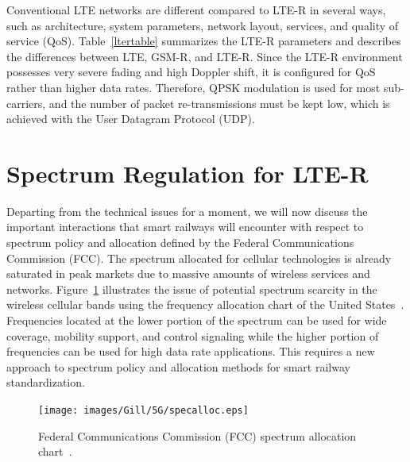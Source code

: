 Conventional LTE networks are different compared to LTE-R in several ways, such as architecture, system parameters, network layout, services, and quality of service (QoS). Table~\ref{ltertable} summarizes the LTE-R parameters and describes the differences between LTE, GSM-R, and LTE-R. Since the LTE-R environment possesses very severe fading and high Doppler shift, it is configured for QoS rather than higher data rates. Therefore, QPSK modulation is used for most sub-carriers, and the number of packet re-transmissions must be kept low, which is achieved with the User Datagram Protocol (UDP).


\section{Spectrum Regulation for LTE-R}

Departing from the technical issues for a moment, we will now discuss the important interactions that smart railways will encounter with respect to spectrum policy and allocation defined by the Federal Communications Commission (FCC). The spectrum allocated for cellular technologies is already saturated in peak markets due to massive amounts of wireless services and networks. Figure~\ref{specalloc} illustrates the issue of potential spectrum scarcity in the wireless cellular bands using the frequency allocation chart of the United States~\cite{fcc}. Frequencies located at the lower portion of the spectrum can be used for wide coverage, mobility support, and control signaling while the higher portion of frequencies can be used for high data rate applications. This requires a new approach to spectrum policy and allocation methods for smart railway standardization.

\begin{figure}[!ht]
	\centering
\texttt{[image: images/Gill/5G/specalloc.eps]}
	\caption{Federal Communications Commission (FCC) spectrum allocation chart~\cite{fcc}.}
	\label{specalloc}
\end{figure}

